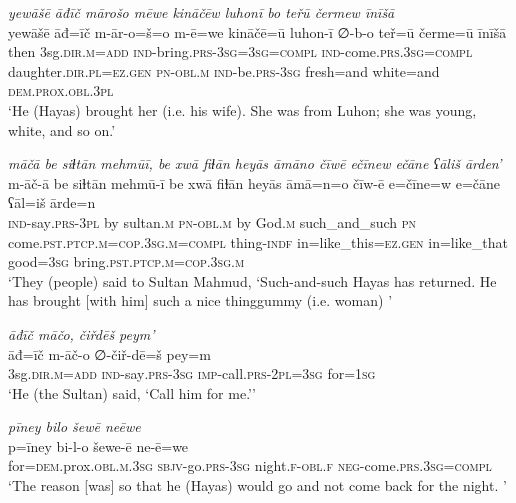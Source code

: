 \ea \label{ŽH.65}
\textit{yewāšē āđīč mārošo mēwe kināčēw luhonī bo teřū čermew īnīšā} \\ 
\gll yewāšē āđ=īč m-ār-o=š=o m-ē=we kināčē=ū luhon-ī ∅-b-o teř=ū čerme=ū īnīšā \\ 
 then 3sg\textsc{.dir}\textsc{.m}\textsc{=add} \textsc{ind-}bring\textsc{.prs}\textsc{-3sg}\textsc{=3sg}\textsc{=compl} \textsc{ind-}come\textsc{.prs}\textsc{.3sg}\textsc{=compl} daughter\textsc{.dir}\textsc{.pl}\textsc{=ez}\textsc{.gen} \textsc{pn}\textsc{-obl}\textsc{.m} \textsc{ind-}be\textsc{.prs}\textsc{-3sg} fresh=and white=and \textsc{dem.prox}\textsc{.obl}\textsc{.3pl} \\ 
\glt `He (Hayas) brought her (i.e. his wife). She was from Luhon; she was young, white, and so on.'
\z 
 
\ea \label{ŽH.66}
\textit{māčā be siɫtān mehmūī, be xwā fiɫān heyās āmāno čīwē ečīnew ečāne ʕāliš ārden’} \\ 
\gll m-āč-ā be siɫtān mehmū-ī be xwā fiɫān heyās āmā=n=o čīw-ē e=čīne=w e=čāne ʕāl=iš ārde=n \\ 
 \textsc{ind-}say\textsc{.prs}\textsc{-3pl} by sultan\textsc{.m} \textsc{pn}\textsc{-obl}\textsc{.m} by God\textsc{.m} such\_and\_such \textsc{pn} come\textsc{.pst}\textsc{.ptcp}\textsc{.m}\textsc{=cop}\textsc{.3sg}\textsc{.m}\textsc{=compl} thing\textsc{-indf} in=like\_this\textsc{=ez}\textsc{.gen} in=like\_that good\textsc{=3sg} bring\textsc{.pst}\textsc{.ptcp}\textsc{.m}\textsc{=cop}\textsc{.3sg}\textsc{.m} \\ 
\glt `They (people) said to Sultan Mahmud, ‘Such-and-such Hayas has returned. He has brought [with him] such a nice thinggummy (i.e. woman)  '
\z 
 
\ea \label{ŽH.67}
\textit{āđīč māčo, čiřdēš peym’} \\ 
\gll āđ=īč m-āč-o ∅-čiř-dē=š pey=m \\ 
 3sg\textsc{.dir}\textsc{.m}\textsc{=add} \textsc{ind-}say\textsc{.prs}\textsc{-3sg} \textsc{imp-}call\textsc{.prs}\textsc{-2pl}\textsc{=3sg} for\textsc{=1sg} \\ 
\glt `He (the Sultan) said, ‘Call him for me.’'
\z 
 
\ea \label{ŽH.70}
\textit{pīney bilo šewē neēwe} \\ 
\gll p=īney bi-l-o šewe-ē ne-ē=we \\ 
 for\textsc{=dem}.prox\textsc{.obl}\textsc{.m}\textsc{.3sg} \textsc{sbjv-}go\textsc{.prs}\textsc{-3sg} night\textsc{\textsc{.f}}\textsc{-obl}\textsc{\textsc{.f}} \textsc{neg-}come\textsc{.prs}\textsc{.3sg}\textsc{=compl} \\ 
\glt `The reason [was] so that he (Hayas) would go and not come back for the night. '
\z 
 
